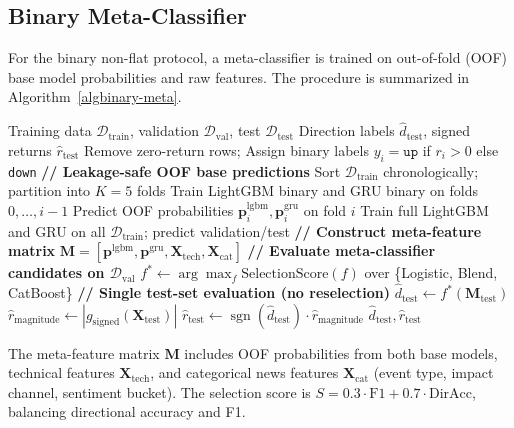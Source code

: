 \documentclass[runningheads]{llncs}
\begin{document}
\subsection{Binary Meta-Classifier}
\label{secbinary-meta}

For the binary non-flat protocol, a meta-classifier is trained on out-of-fold (OOF) base model probabilities and raw features. The procedure is summarized in Algorithm~\ref{algbinary-meta}.

\begin{algorithm}[H]
\caption{Binary Non-Flat Meta-Classifier Pipeline}
\label{algbinary-meta}
\begin{algorithmic}[1]
\REQUIRE Training data $\mathcal{D}_{\text{train}}$, validation $\mathcal{D}_{\text{val}}$, test $\mathcal{D}_{\text{test}}$
\ENSURE Direction labels $\hat{d}_{\text{test}}$, signed returns $\hat{r}_{\text{test}}$
\STATE Remove zero-return rows; Assign binary labels $y_i = \texttt{up}$ if $r_i > 0$ else \texttt{down}
\STATE \textbf{// Leakage-safe OOF base predictions}
\STATE Sort $\mathcal{D}_{\text{train}}$ chronologically; partition into $K = 5$ folds
  \STATE Train LightGBM binary and GRU binary on folds $0, \ldots, i-1$
  \STATE Predict OOF probabilities $\mathbf{p}^{\text{lgbm}}_i, \mathbf{p}^{\text{gru}}_i$ on fold $i$
\ENDFOR
\STATE Train full LightGBM and GRU on all $\mathcal{D}_{\text{train}}$; predict validation/test
\STATE \textbf{// Construct meta-feature matrix}
\STATE $\mathbf{M} = [\mathbf{p}^{\text{lgbm}}, \mathbf{p}^{\text{gru}}, \mathbf{X}_{\text{tech}}, \mathbf{X}_{\text{cat}}]$
\STATE \textbf{// Evaluate meta-classifier candidates on $\mathcal{D}_{\text{val}}$}
\STATE $f^* \gets \arg\max_f \text{SelectionScore}(f)$ over \{Logistic, Blend, CatBoost\}
\STATE \textbf{// Single test-set evaluation (no reselection)}
\STATE $\hat{d}_{\text{test}} \gets f^*(\mathbf{M}_{\text{test}})$
\STATE $\hat{r}_{\text{magnitude}} \gets |g_{\text{signed}}(\mathbf{X}_{\text{test}})|$
\STATE $\hat{r}_{\text{test}} \gets \operatorname{sgn}(\hat{d}_{\text{test}}) \cdot \hat{r}_{\text{magnitude}}$
\RETURN $\hat{d}_{\text{test}}, \hat{r}_{\text{test}}$
\end{algorithmic}
\end{algorithm}

The meta-feature matrix $\mathbf{M}$ includes OOF probabilities from both base models, technical features $\mathbf{X}_{\text{tech}}$, and categorical news features $\mathbf{X}_{\text{cat}}$ (event type, impact channel, sentiment bucket). The selection score is $S = 0.3 \cdot \text{F1} + 0.7 \cdot \text{DirAcc}$, balancing directional accuracy and F1.
\end{document}

